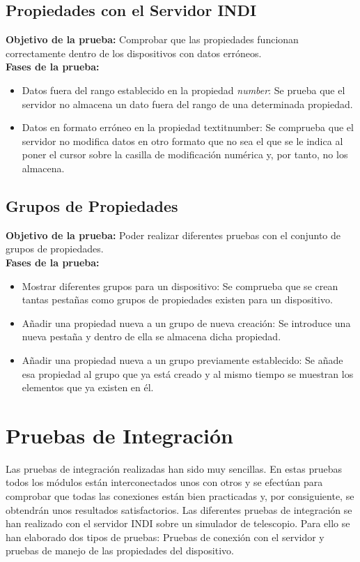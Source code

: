 \subsection{Propiedades con el Servidor INDI}
\textbf{Objetivo de la prueba:} Comprobar que las propiedades funcionan correctamente dentro de los dispositivos con datos erróneos.\\

\textbf{Fases de la prueba:}
\begin{itemize}
  \item Datos fuera del rango establecido en la propiedad \textit{number}: Se prueba que el servidor no almacena un dato fuera del rango de una determinada propiedad.
  \item Datos en formato erróneo en la propiedad textit{number}: Se comprueba que el servidor no modifica datos en otro formato que no sea el que se le indica al poner el cursor sobre la casilla de modificación numérica y, por tanto, no los almacena.
\end{itemize}

\subsection{Grupos de Propiedades}
\textbf{Objetivo de la prueba:} Poder realizar diferentes pruebas con el conjunto de grupos de propiedades.\\

\textbf{Fases de la prueba:}
\begin{itemize}
  \item Mostrar diferentes grupos para un dispositivo: Se comprueba que se crean tantas pestañas como grupos de propiedades existen para un dispositivo.
  \item Añadir una propiedad nueva a un grupo de nueva creación: Se introduce una nueva pestaña y dentro de ella se almacena dicha propiedad.
  \item Añadir una propiedad nueva a un grupo previamente establecido: Se añade esa propiedad al grupo que ya está creado y al mismo tiempo se muestran los elementos que ya existen en él.
\end{itemize}

\section{Pruebas de Integración}
Las pruebas de integración realizadas han sido muy sencillas. En estas pruebas todos los módulos están interconectados unos con otros y se efectúan para comprobar que todas las conexiones están bien practicadas y, por consiguiente, se obtendrán unos resultados satisfactorios. Las diferentes pruebas de integración se han realizado con el servidor INDI sobre un simulador de telescopio. Para ello se han elaborado dos tipos de pruebas: Pruebas de conexión con el servidor y pruebas de manejo de las propiedades del dispositivo.

